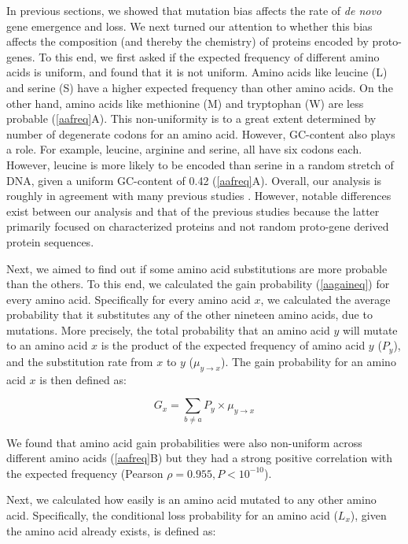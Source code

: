 \documentclass[12pt,a4paper]{article}
\begin{document}
In previous sections, we showed that mutation bias affects the rate of \textit{de novo} gene emergence and loss. We next turned our attention to whether this bias affects the composition (and thereby the chemistry) of proteins encoded by proto-genes. To this end, we first asked if the expected frequency of different amino acids is uniform, and found that it is not uniform. Amino acids like leucine (L) and serine (S) have a higher expected frequency than other amino acids. On the other hand, amino acids like methionine (M) and tryptophan (W) are less probable (\autoref{aafreq}{\color{blue}A}). This non-uniformity is to a great extent determined by number of degenerate codons for an amino acid. However, GC-content also plays a role. For example, leucine, arginine and serine, all have six codons each. However, leucine is more likely to be encoded than serine in a random stretch of DNA, given a uniform GC-content of 0.42 (\autoref{aafreq}{\color{blue}A}). Overall, our analysis is roughly in agreement with many previous studies \citep{aasubOhta,aafreq3,aafreq4}. However, notable differences exist between our analysis and that of the previous studies because the latter primarily focused on characterized proteins and not random proto-gene derived protein sequences. 

Next, we aimed to find out if some amino acid substitutions are more probable than the others. To this end, we calculated the gain probability (\autoref{aagaineq}) for every amino acid. Specifically for every amino acid $x$, we calculated the average probability that it substitutes any of the other nineteen amino acids, due to mutations. More precisely, the total probability that an amino acid $y$ will mutate to an amino acid $x$ is the product of the expected frequency of amino acid $y$ ($P_y$), and the substitution rate from $x$ to $y$ ($\mu_{y\to x}$). The gain probability for an amino acid $x$ is then defined as:

\begin{equation}
G_x = \sum_{b \neq a} P_y \times \mu_{y\to x}
\label{aagaineq}
\end{equation}

We found that amino acid gain probabilities were also non-uniform across different amino acids (\autoref{aafreq}{\color{blue}B}) but they had a strong positive correlation with the expected frequency (Pearson $\rho = 0.955, P<10^{-10}$).

Next, we calculated how easily is an amino acid mutated to any other amino acid. Specifically, the conditional loss probability for an amino acid ($L_x$), given the amino acid already exists, is defined as:
\end{document}
